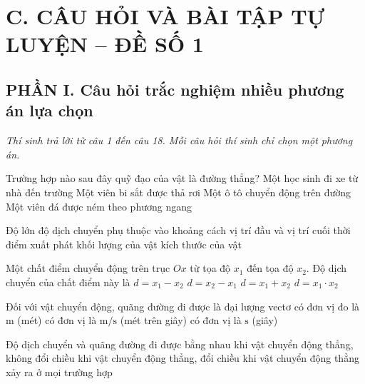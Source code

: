 \section*{C. CÂU HỎI VÀ BÀI TẬP TỰ LUYỆN -- ĐỀ SỐ 1}

\setcounter{ex}{0}
\subsection*{PHẦN I. Câu hỏi trắc nghiệm nhiều phương án lựa chọn}
\textit{Thí sinh trả lời từ câu 1 đến câu 18. Mỗi câu hỏi thí sinh chỉ chọn một phương án.}

\begin{ex} Trường hợp nào sau đây quỹ đạo của vật là đường thẳng?
\choice
{Một học sinh đi xe từ nhà đến trường}
{\True Một viên bi sắt được thả rơi}
{Một ô tô chuyển động trên đường}
{Một viên đá được ném theo phương ngang}
\end{ex}

\begin{ex} Độ lớn độ dịch chuyển phụ thuộc vào
\choice
{\True khoảng cách vị trí đầu và vị trí cuối}
{thời điểm xuất phát}
{khối lượng của vật}
{kích thước của vật}
\end{ex}

\begin{ex} Một chất điểm chuyển động trên trục $Ox$ từ tọa độ $x_1$ đến tọa độ $x_2$. Độ dịch chuyển của chất điểm này là
\choice
{$d = x_1 - x_2$}
{\True $d = x_2 - x_1$}
{$d = x_1 + x_2$}
{$d = x_1 \cdot x_2$}
\end{ex}

\begin{ex} Đối với vật chuyển động, quãng đường đi được
\choice
{là đại lượng vectơ}
{\True có đơn vị đo là $\text{m}$ (mét)}
{có đơn vị là $\text{m/s}$ (mét trên giây)}
{có đơn vị là $\text{s}$ (giây)}
\end{ex}

\begin{ex} Độ dịch chuyển và quãng đường đi được bằng nhau
\choice
{\True khi vật chuyển động thẳng, không đổi chiều}
{khi vật chuyển động thẳng, đổi chiều}
{khi vật chuyển động thẳng}
{xảy ra ở mọi trường hợp}
\end{ex}

